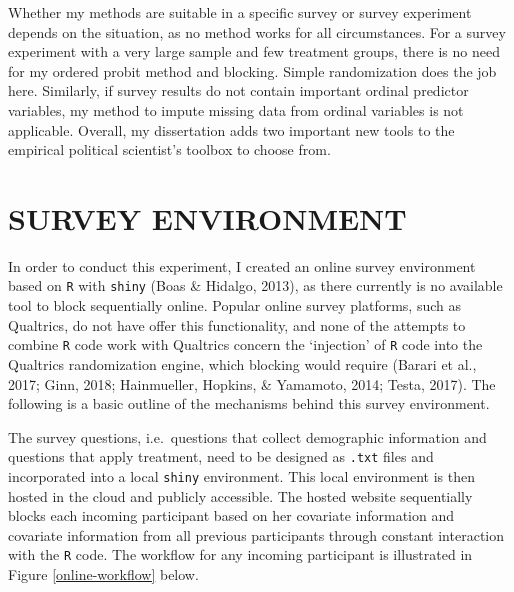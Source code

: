 \documentclass[12pt,econ]{sources/authesis}
\begin{document}
Whether my methods are suitable in a specific survey or survey experiment depends on the situation, as no method works for all circumstances. For a survey experiment with a very large sample and few treatment groups, there is no need for my ordered probit method and blocking. Simple randomization does the job here. Similarly, if survey results do not contain important ordinal predictor variables, my method to impute missing data from ordinal variables is not applicable. Overall, my dissertation adds two important new tools to the empirical political scientist's toolbox to choose from.

\appendix

\hypertarget{app-survey}{%
\chapter{SURVEY ENVIRONMENT}\label{app-survey}}

In order to conduct this experiment, I created an online survey environment based on \texttt{R} with \texttt{shiny} (Boas \& Hidalgo, 2013), as there currently is no available tool to block sequentially online. Popular online survey platforms, such as Qualtrics, do not have offer this functionality, and none of the attempts to combine \texttt{R} code work with Qualtrics concern the `injection' of \texttt{R} code into the Qualtrics randomization engine, which blocking would require (Barari et al., 2017; Ginn, 2018; Hainmueller, Hopkins, \& Yamamoto, 2014; Testa, 2017). The following is a basic outline of the mechanisms behind this survey environment.

The survey questions, i.e.~questions that collect demographic information and questions that apply treatment, need to be designed as \texttt{.txt} files and incorporated into a local \texttt{shiny} environment. This local environment is then hosted in the cloud and publicly accessible. The hosted website sequentially blocks each incoming participant based on her covariate information and covariate information from all previous participants through constant interaction with the \texttt{R} code. The workflow for any incoming participant is illustrated in Figure \ref{online-workflow} below.
\end{document}
